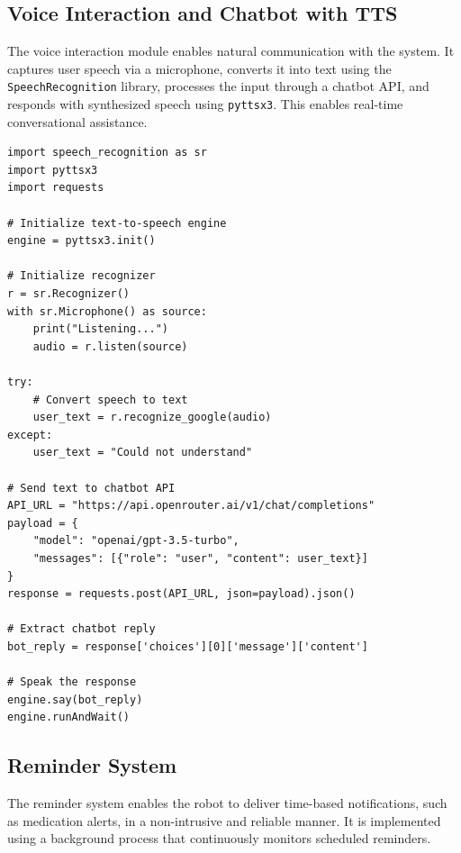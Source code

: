 \subsection*{Voice Interaction and Chatbot with TTS}
The voice interaction module enables natural communication with the system. 
It captures user speech via a microphone, converts it into text using the 
\texttt{SpeechRecognition} library, processes the input through a chatbot 
API, and responds with synthesized speech using \texttt{pyttsx3}. This 
enables real-time conversational assistance.

\begin{verbatim}
import speech_recognition as sr
import pyttsx3
import requests

# Initialize text-to-speech engine
engine = pyttsx3.init()

# Initialize recognizer
r = sr.Recognizer()
with sr.Microphone() as source:
    print("Listening...")
    audio = r.listen(source)

try:
    # Convert speech to text
    user_text = r.recognize_google(audio)
except:
    user_text = "Could not understand"

# Send text to chatbot API
API_URL = "https://api.openrouter.ai/v1/chat/completions"
payload = {
    "model": "openai/gpt-3.5-turbo",
    "messages": [{"role": "user", "content": user_text}]
}
response = requests.post(API_URL, json=payload).json()

# Extract chatbot reply
bot_reply = response['choices'][0]['message']['content']

# Speak the response
engine.say(bot_reply)
engine.runAndWait()
\end{verbatim}


\subsection*{Reminder System}

The reminder system enables the robot to deliver time-based notifications, such as 
medication alerts, in a non-intrusive and reliable manner. It is implemented using 
a background process that continuously monitors scheduled reminders.


